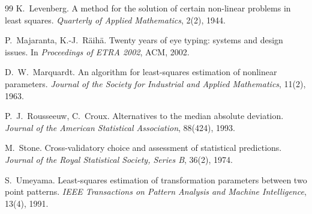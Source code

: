 \begin{thebibliography}{99}
K.~Levenberg.
\newblock A method for the solution of certain non-linear problems in least squares.
\newblock \emph{Quarterly of Applied Mathematics}, 2(2), 1944.

P.~Majaranta, K.-J.~Räihä.
\newblock Twenty years of eye typing: systems and design issues.
\newblock In \emph{Proceedings of ETRA 2002}, ACM, 2002.

D.~W.~Marquardt.
\newblock An algorithm for least-squares estimation of nonlinear parameters.
\newblock \emph{Journal of the Society for Industrial and Applied Mathematics}, 11(2), 1963.

P.~J.~Rousseeuw, C.~Croux.
\newblock Alternatives to the median absolute deviation.
\newblock \emph{Journal of the American Statistical Association}, 88(424), 1993.

M.~Stone.
\newblock Cross-validatory choice and assessment of statistical predictions.
\newblock \emph{Journal of the Royal Statistical Society, Series B}, 36(2), 1974.

S.~Umeyama.
\newblock Least-squares estimation of transformation parameters between two point patterns.
\newblock \emph{IEEE Transactions on Pattern Analysis and Machine Intelligence}, 13(4), 1991.

\end{thebibliography}
